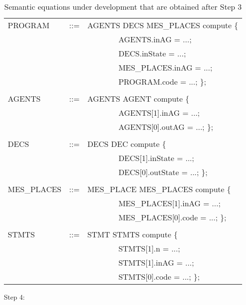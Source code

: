 \documentclass[preprint, prX]{revtex4}
\begin{document}
\begin{table}[htb]           \caption{Semantic equations under development that are obtained after Step 3}
\label{tab:tab19}
\vspace{-5mm}
\footnotesize
\begin{center}
\begin{tabular}{ | l  l  l | }
\hline
PROGRAM & ::= & AGENTS DECS MES\_PLACES  compute \{ \\
 & &            \ \ \ \ \ \ \ \ AGENTS.inAG = ...; \\
 & &            \ \ \ \ \ \ \ \ DECS.inState = ...; \\
 & &            \ \ \ \ \ \ \ \ MES\_PLACES.inAG = ...; \\
 & &            \ \ \ \ \ \ \ \ PROGRAM.code = ...; \}; \\
 & & \\
AGENTS & ::= & AGENTS  AGENT compute \{ \\
 & &       \ \ \ \ \ \ \ \ AGENTS[1].inAG = ...; \\
 & &       \ \ \ \ \ \ \ \ AGENTS[0].outAG = ...; \};\\
 & & \\
DECS & ::= & DECS DEC compute \{ \\
 & &        \ \ \ \ \ \ \ \ DECS[1].inState = ...; \\
 & &        \ \ \ \ \ \ \ \ DECS[0].outState = ...; \}; \\
 & & \\
MES\_PLACES & ::= & MES\_PLACE MES\_PLACES compute \{ \\
 & &            \ \ \ \ \ \ \ \ MES\_PLACES[1].inAG = ...; \\
 & &            \ \ \ \ \ \ \ \ MES\_PLACES[0].code = ...; \}; \\
 & & \\
STMTS & ::= & STMT STMTS compute \{ \\
 & &            \ \ \ \ \ \ \ \ STMTS[1].n = ...; \\
 & &            \ \ \ \ \ \ \ \ STMTS[1].inAG = ...; \\
 & &            \ \ \ \ \ \ \ \ STMTS[0].code = ...; \}; \\
\hline
\end{tabular}
\end{center}
\normalsize
\vspace{-5mm}
\end{table}

\newpage
Step 4:
\end{document}
